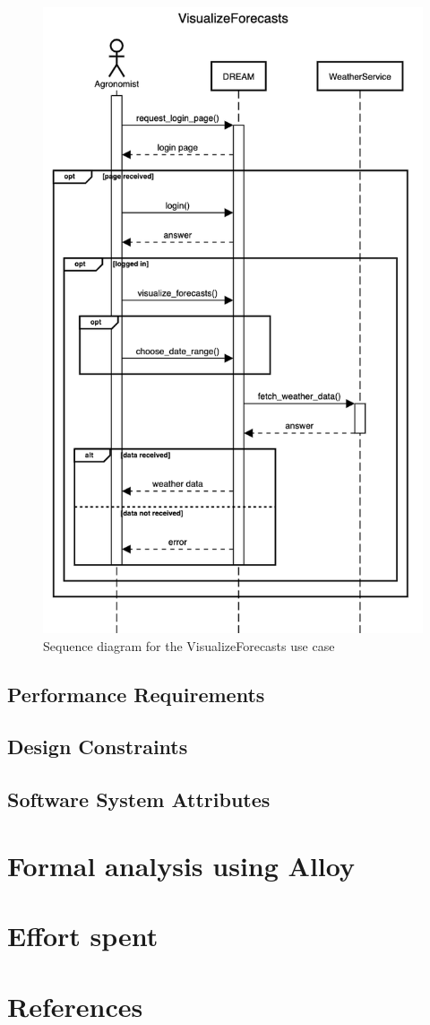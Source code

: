 \documentclass{article}
\begin{document}
\begin{figure}[h]
    \centering
	\includegraphics[scale=0.5]{sequence_diagrams/VisualizeForecasts}
    \caption{Sequence diagram for the VisualizeForecasts use case}
\end{figure}

\subsection{Performance Requirements}
\subsection{Design Constraints}
\subsection{Software System Attributes}
\section{Formal analysis using Alloy}
\section{Effort spent}
\section{References}
\end{document}
